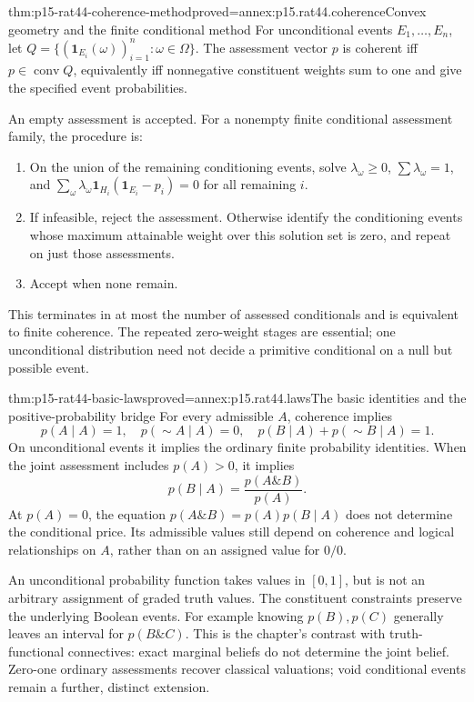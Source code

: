 \begin{hbtheorem}{thm:p15-rat44-coherence-method}{proved=annex:p15.rat44.coherence}{Convex geometry and the finite conditional method}
For unconditional events \(E_1,\ldots,E_n\), let
\(Q=\{(\mathbf1_{E_i}(\omega))_{i=1}^n:\omega\in\Omega\}\).
The assessment vector \(p\) is coherent iff \(p\in\operatorname{conv}Q\),
equivalently iff nonnegative constituent weights sum to one and give
the specified event probabilities.

An empty assessment is accepted. For a nonempty finite conditional
assessment family, the procedure is:
\begin{enumerate}
\item On the union of the remaining conditioning events, solve
      \(\lambda_\omega\geq0\), \(\sum\lambda_\omega=1\), and
      \(\sum_\omega\lambda_\omega\mathbf1_{H_i}
                  (\mathbf1_{E_i}-p_i)=0\) for all remaining \(i\).
\item If infeasible, reject the assessment. Otherwise identify the
      conditioning events whose maximum attainable weight over this
      solution set is zero, and repeat on just those assessments.
\item Accept when none remain.
\end{enumerate}
This terminates in at most the number of assessed conditionals and is
equivalent to finite coherence. The repeated zero-weight stages are
essential; one unconditional distribution need not decide a primitive
conditional on a null but possible event.
\end{hbtheorem}

\begin{hbtheorem}{thm:p15-rat44-basic-laws}{proved=annex:p15.rat44.laws}{The basic identities and the positive-probability bridge}
For every admissible \(A\), coherence implies
\[
 p(A\mid A)=1,\quad p(\sim A\mid A)=0,\quad
 p(B\mid A)+p(\sim B\mid A)=1.
\]
On unconditional events it implies the ordinary finite probability
identities. When the joint assessment includes \(p(A)>0\), it implies
\[
              p(B\mid A)=\frac{p(A\mathbin{\&}B)}{p(A)}.
\]
At \(p(A)=0\), the equation
\(p(A\mathbin{\&}B)=p(A)p(B\mid A)\) does not determine the
conditional price. Its admissible values still depend on coherence and
logical relationships on \(A\), rather than on an assigned value for \(0/0\).
\end{hbtheorem}

An unconditional probability function takes values in \([0,1]\), but
is not an arbitrary assignment of graded truth values. The constituent
constraints preserve the underlying Boolean events. For example knowing
\(p(B),p(C)\) generally leaves an interval for
\(p(B\mathbin{\&}C)\). This is the chapter's contrast with
truth-functional connectives: exact marginal beliefs do not determine
the joint belief. Zero-one ordinary assessments recover classical
valuations; void conditional events remain a further, distinct extension.

